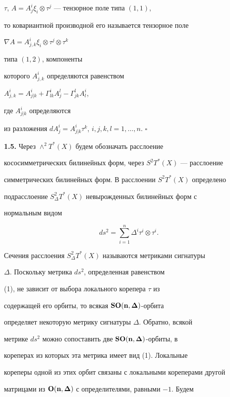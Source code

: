$\tau$, $A=A^i_j\xi_i\otimes\tau^j$ --- тензорное поле типа $(1,1)$,


то ковариантной производной его называется тензорное поле


$\nabla A=A^i_{j,k}\xi_i\otimes\tau^j\otimes\tau^k$


типа $(1,2)$, компоненты


которого $A^i_{j,k}$ определяются равенством


$A^i_{j,k}=A^i_{j|k}+\Gamma^i_{lk}A^l_j-\Gamma^l_{jk}A^i_l$,


где $A^i_{j|k}$ определяются


из разложения $dA^i_j=A^i_{j|k}\tau^k$, $i,j,k,l=1,\dotsc,n$. $\square$


\medskip





{\bf 1.5.} Через $\wedge^2T^*(X)$ будем обозначать расслоение


кососимметрических билинейных форм, через $S^2T^*(X)$ --- расслоение


симметрических билинейных форм. В расслоении $S^2T^*(X)$ определено


подрасслоение $S^2_{\Delta}T^*(X)$ невырожденных билинейных форм с


нормальным видом


\begin{equation}


ds^2=\sum_{i=1}^{n}\Delta^i\tau^i\otimes\tau^i.


\end{equation}


Сечения расслоения $S^2_{\Delta}T^*(X)$ называются метриками сигнатуры


$\Delta$. Поскольку метрика $ds^2$, определенная равенством


(1), не зависит от выбора локального корепера $\tau$ из


содержащей его орбиты, то всякая $\bold{SO(n,\boldsymbol\Delta)}$-орбита


определяет некоторую метрику сигнатуры $\Delta$. Обратно, всякой


метрике $ds^2$ можно сопоставить две $\bold{SO(n,\boldsymbol\Delta)}$-орбиты, в


кореперах из которых эта метрика имеет вид (1). Локальные


кореперы одной из этих орбит связаны с локальными кореперами другой


матрицами из $\bold{O(n,\boldsymbol\Delta)}$ с определителями, равными $-1$. Будем


